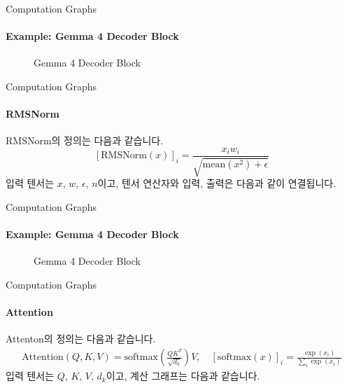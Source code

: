 \begin{frame}{Computation Graphs}
\framesubtitle{Example: Gemma 4 Decoder Block}

\begin{figure}
  \centering
  \caption{Gemma 4 Decoder Block}
\end{figure}
\end{frame}

\begin{frame}{Computation Graphs}
\framesubtitle{RMSNorm}

RMSNorm의 정의는 다음과 같습니다.
\[
  [\mathrm{RMSNorm}(x)]_i = \frac{x_i w_i}{\sqrt{\mathrm{mean}(x^2) + \epsilon}}
\]
\pause
입력 텐서는 \(x\), \(w\), \(\epsilon\), \(n\)이고, 텐서 연산자와 입력, 출력은 다음과 같이 연결됩니다.
\begin{figure}
  \centering
\end{figure}
\end{frame}

\begin{frame}{Computation Graphs}
\framesubtitle{Example: Gemma 4 Decoder Block}

\begin{figure}
  \centering
  \caption{Gemma 4 Decoder Block}
\end{figure}
\end{frame}

\begin{frame}{Computation Graphs}
\framesubtitle{Attention}
Attenton의 정의는 다음과 같습니다.
\begin{align*}
  \mathrm{Attention}(Q, K, V) = \mathrm{softmax}\left(\frac{QK^T}{\sqrt{d_k}}\right) V, \quad
  [\mathrm{softmax}(x)]_i = \frac{\exp{(x_i)}}{\sum_i \exp{(x_i)}}
\end{align*}
\pause
입력 텐서는 \(Q\), \(K\), \(V\), \(d_k\)이고, 계산 그래프는 다음과 같습니다.
\begin{figure}
  \centering
\end{figure}
\end{frame}